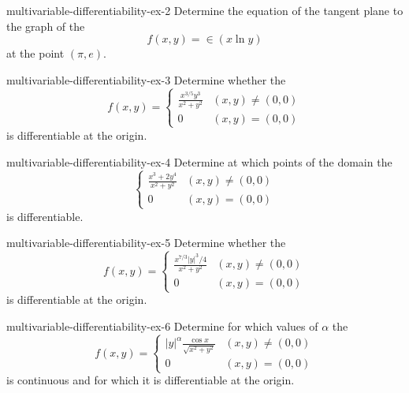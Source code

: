 \documentclass[preview]{standalone}
\begin{document}
\begin{snippetexercise}{multivariable-differentiability-ex-2}{}
    Determine the equation of the tangent plane
    to the graph of the \function
    \[ f(x,y) = \in(x\ln y) \]
    at the point \((\pi, e)\).
\end{snippetexercise}

\begin{snippetexercise}{multivariable-differentiability-ex-3}{}
    Determine whether the \function
    \[
        f(x,y) = \begin{cases}
            \frac{x^{3/5}y^3}{x^2 + y^2} & (x,y) \neq (0,0) \\
            0 & (x,y) = (0,0)
        \end{cases}
    \]
    is differentiable at the origin.
\end{snippetexercise}

\begin{snippetexercise}{multivariable-differentiability-ex-4}{}
    Determine at which points of the domain the \function
    \[
        \begin{cases}
            \frac{x^3 + 2y^4}{x^2 + y^2} & (x,y) \neq (0,0) \\
            0 & (x,y) = (0,0)
        \end{cases}
    \]
    is differentiable.
\end{snippetexercise}

\begin{snippetexercise}{multivariable-differentiability-ex-5}{}
    Determine whether the \function
    \[
        f(x,y) = \begin{cases}
            \frac{x^{7/3}{|y|}^3/4}{x^2 + y^2} & (x,y) \neq (0,0) \\
            0 & (x,y) = (0,0)
        \end{cases}
    \]
    is differentiable at the origin.
\end{snippetexercise}

\begin{snippetexercise}{multivariable-differentiability-ex-6}{}
    Determine for which values of \(\alpha\) the \function
    \[
        f(x,y) = \begin{cases}
            {|y|}^\alpha \frac{\cos x}{\sqrt{x^2 + y^2}} & (x,y) \neq (0,0) \\
            0 & (x,y) = (0,0)
        \end{cases}
    \]
    is continuous and for which it is differentiable at the origin.
\end{snippetexercise}
\end{document}
